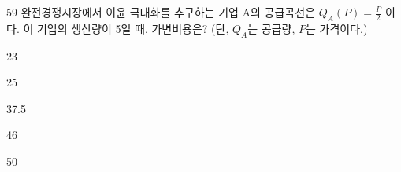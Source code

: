 \begin{question}{59}
완전경쟁시장에서 이윤 극대화를 추구하는 기업 A의 공급곡선은 $Q_{A}(P)=\frac{P}{2}$ 이다. 이 기업의 생산량이 5일 때, 가변비용은? (단, $Q_{A}$는 공급량, $P$는 가격이다.)
\begin{choices}
  \item 23
  \item 25
  \item 37.5
  \item 46
  \item 50
\end{choices}
\end{question}
